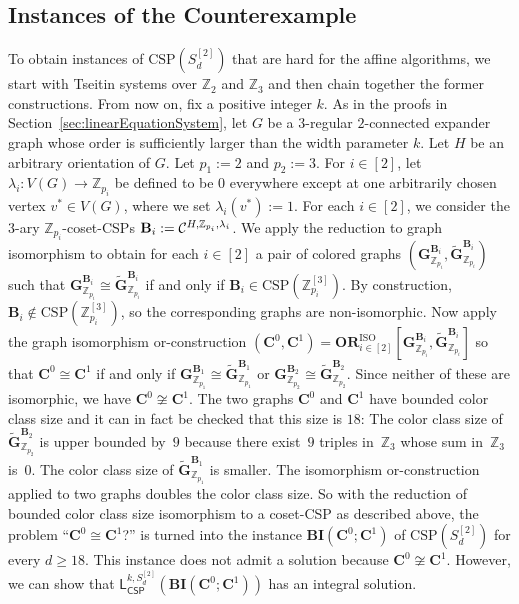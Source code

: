\documentclass[a4paper,english, thm-restate]{lipics-v2021}
\newcommand{\ZZ}{\mathbb{Z}}
\newcommand{\CFIsym}{\mathbf{G}}
\newcommand{\CFIA}[2]{\CFIsym_{#1}^{#2}}
\newcommand{\CFIB}[2]{\widetilde{\CFIsym}_{#1}^{#2}}
\newcommand{\StructB}{\mathbf{B}}
\newcommand{\StructC}{\mathbf{C}}
\newcommand{\CSP}[1]{\mathrm{CSP}(#1)}
\newcommand{\leqs}{\mathsf{L}}
\newcommand{\cspiso}[3]{\leqs^{#1,#2}_{\mathsf{CSP}}(#3)}
\newcommand{\bbZ}{\mathbb{Z}}
\newcommand{\bcisosys}[2]{\mathbf{BI}(#1;#2)}
\newcommand{\CosetGrpTmplt}[2]{#1^{[#2]}}
\newcommand{\Sym}[1]{S_{#1}}
\newcommand{\ORISO}[2]{\mathbf{OR}^{\text{ISO}}_{#1}[#2]}
\begin{document}
	
	
	
	\subsection{Instances of the Counterexample}
	\label{sec:group-csp-counterexamle-instances}
	
	To obtain instances of $\CSP{\CosetGrpTmplt{\Sym{d}}{2}}$
	that are hard for the affine algorithms,
	we start with Tseitin systems over $\ZZ_2$ and $\ZZ_3$
	and then chain together the former constructions.
	From now on, fix a positive integer $k$.
	As in the proofs in Section~\ref{sec:linearEquationSystem},
	let $G$ be a $3$\nobreakdash-regular $2$\nobreakdash-connected expander graph whose order is sufficiently larger than the width parameter $k$.
	Let $H$ be an arbitrary orientation of $G$.
	Let $p_1 := 2$ and $p_2 := 3$. For $i \in [2]$,
	let $\lambda_i \colon V(G) \to \ZZ_{p_i}$ be defined to be $0$ everywhere except at one arbitrarily chosen vertex $v^* \in V(G)$, where we set $\lambda_i(v^*) := 1$.
	For each $i \in [2]$, we consider the $3$-ary $\ZZ_{p_i}$-coset-CSPs $\StructB_i := \grpCSP{H}{\ZZ_{p_i}}{\lambda_i}$. 
	We apply the reduction to graph isomorphism to obtain for each $i \in [2]$ a pair of colored graphs
	$(\CFIA{\bbZ_{p_i}}{\StructB_i}, \CFIB{\bbZ_{p_i}}{\StructB_i})$ such that $\CFIA{\bbZ_{p_i}}{\StructB_i} \cong \CFIB{\bbZ_{p_i}}{\StructB_i}$ if and only if $\StructB_i \in \CSP{\CosetGrpTmplt{\ZZ_{p_i}}{3}}$.
	By construction, $\StructB_i \notin \CSP{\CosetGrpTmplt{\ZZ_{p_i}}{3}}$, so the corresponding graphs are non-isomorphic. 
	Now apply the graph isomorphism or-construction $(\StructC^0, \StructC^1) =
	\ORISO{i \in [2]}{\CFIA{\bbZ_{p_i}}{\StructB_i},\CFIB{\bbZ_{p_i}}{\StructB_i}}$
	so that $\StructC^0 \cong \StructC^1$ if and only if $\CFIA{\bbZ_{p_1}}{\StructB_1} \cong \CFIB{\bbZ_{p_1}}{\StructB_1}$ or $\CFIA{\bbZ_{p_2}}{\StructB_2} \cong \CFIB{\bbZ_{p_2}}{\StructB_2}$. Since neither of these are isomorphic, we have $\StructC^0 \not\cong \StructC^1$. 
	The two graphs $\StructC^0$ and $\StructC^1$ have bounded color class size and it can in fact be checked that this size is $18$:
	The color class size of $\CFIB{\bbZ_{p_2}}{\StructB_2}$ is upper bounded by~$9$ because there exist~$9$ triples in~$\bbZ_{3}$ whose sum in~$\bbZ_3$ is~$0$. The color class size of $\CFIB{\bbZ_{p_1}}{\StructB_1}$ is smaller. The isomorphism or-construction applied to two graphs doubles the color class size.  
	So with the reduction of bounded color class size isomorphism to a coset-CSP as described above,
	the problem ``$\StructC^0 \cong \StructC^1$?'' is turned into the instance $\bcisosys{\StructC^0}{\StructC^1}$ of $\CSP{\CosetGrpTmplt{\Sym{d}}{2}}$ for every $d \geq 18$. This instance does not admit a solution because $\StructC^0 \not\cong \StructC^1$.
	However, we can show that $\cspiso{k}{\CosetGrpTmplt{\Sym{d}}{2}}{\bcisosys{\StructC^0}{\StructC^1}}$ has an integral solution.
	
\end{document}
